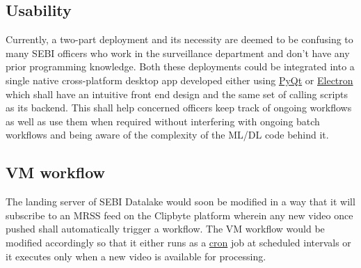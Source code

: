\subsection{Usability}

Currently, a two-part deployment and its necessity are deemed to be confusing to many SEBI officers who work in the surveillance department and don’t have any prior programming knowledge. Both these deployments could be integrated into a single native cross-platform desktop app developed either using \href{https://riverbankcomputing.com/software/pyqt/intro}{PyQt} or \href{electronjs.org}{Electron} which shall have an intuitive front end design and the same set of calling scripts as its backend. This shall help concerned officers keep track of ongoing workflows as well as use them when required without interfering with ongoing batch workflows and being aware of the complexity of the ML/DL code behind it.

\subsection{VM workflow} \label{future}

The landing server of SEBI Datalake would soon be modified in a way that it will subscribe to an MRSS feed on the Clipbyte platform wherein any new video once pushed shall automatically trigger a workflow. The VM workflow would be modified accordingly so that it either runs as a \href{https://en.wikipedia.org/wiki/Cron}{cron} job at scheduled intervals or it executes only when a new video is available for processing.
